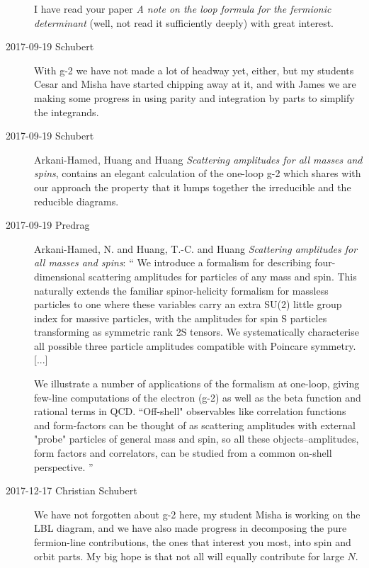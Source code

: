 \begin{description}
I have read your paper
{\em A note on the loop formula for the fermionic determinant}
(well, not read it sufficiently deeply)
with great interest.

\item[2017-09-19 Schubert]
With g-2 we have not made a lot of headway yet, either, but my students Cesar
and Misha have started chipping away at it,  and with James we are making
some progress in using parity and integration by parts to simplify the
integrands.

\item[2017-09-19 Schubert]
Arkani-Hamed, Huang and Huang
{\em Scattering amplitudes for all masses and spins}, 
 contains an
elegant calculation of the one-loop g-2 which shares with our approach the
property that it lumps together the irreducible and the reducible diagrams.

\item[2017-09-19 Predrag]
Arkani-Hamed, N. and Huang, T.-C. and Huang
{\em Scattering amplitudes for all masses and spins}: ``
We introduce a formalism for describing four-dimensional scattering
amplitudes for particles of any mass and spin. This naturally extends the
familiar spinor-helicity formalism for massless particles to one where these
variables carry an extra SU(2) little group index for massive particles, with
the amplitudes for spin S particles transforming as symmetric rank 2S
tensors. We systematically characterise all possible three particle
amplitudes compatible with Poincare symmetry. [...]

We illustrate a number of
applications of the formalism at one-loop, giving few-line computations of
the electron (g-2) as well as the beta function and rational terms in QCD.
``Off-shell" observables like correlation functions and form-factors can be
thought of as scattering amplitudes with external "probe" particles of
general mass and spin, so all these objects--amplitudes, form factors and
correlators, can be studied from a common on-shell perspective.
''

\item[2017-12-17 Christian Schubert]
We have not forgotten about g-2 here, my student Misha is working on the
LBL diagram, and we have also made progress in decomposing the pure
fermion-line contributions, the ones that interest you most, into spin
and orbit parts. My big hope is that not all will equally contribute for
large $N$.


\end{description}
